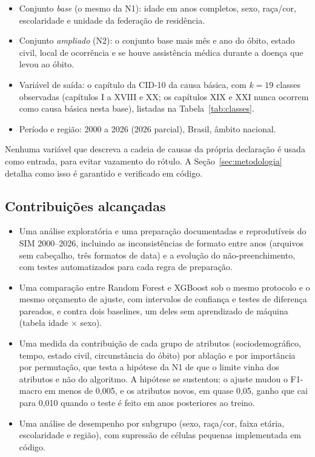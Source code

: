 \documentclass[12pt]{article}
\begin{document}
\begin{itemize}
  \item Conjunto \emph{base} (o mesmo da N1): idade em anos completos, sexo, raça/cor, escolaridade e unidade da federação de residência.
  \item Conjunto \emph{ampliado} (N2): o conjunto base mais mês e ano do óbito, estado civil, local de ocorrência e se houve assistência médica durante a doença que levou ao óbito.
  \item Variável de saída: o capítulo da CID-10 da causa básica, com $k = 19$ classes observadas (capítulos I a XVIII e XX; os capítulos XIX e XXI nunca ocorrem como causa básica nesta base), listadas na Tabela~\ref{tab:classes}.
  \item Período e região: 2000 a 2026 (2026 parcial), Brasil, âmbito nacional.
\end{itemize}

Nenhuma variável que descreva a cadeia de causas da própria declaração é usada como entrada, para evitar vazamento do rótulo. A Seção~\ref{sec:metodologia} detalha como isso é garantido e verificado em código.

\subsection{Contribuições alcançadas}

\begin{itemize}
  \item Uma análise exploratória e uma preparação documentadas e reprodutíveis do SIM 2000--2026, incluindo as inconsistências de formato entre anos (arquivos sem cabeçalho, três formatos de data) e a evolução do não-preenchimento, com testes automatizados para cada regra de preparação.
  \item Uma comparação entre Random Forest e XGBoost sob o mesmo protocolo e o mesmo orçamento de ajuste, com intervalos de confiança e testes de diferença pareados, e contra dois baselines, um deles sem aprendizado de máquina (tabela idade $\times$ sexo).
  \item Uma medida da contribuição de cada grupo de atributos (sociodemográfico, tempo, estado civil, circunstância do óbito) por ablação e por importância por permutação, que testa a hipótese da N1 de que o limite vinha dos atributos e não do algoritmo. A hipótese se sustentou: o ajuste mudou o F1-macro em menos de 0,005, e os atributos novos, em quase 0,05, ganho que cai para 0,010 quando o teste é feito em anos posteriores ao treino.
  \item Uma análise de desempenho por subgrupo (sexo, raça/cor, faixa etária, escolaridade e região), com supressão de células pequenas implementada em código.
\end{itemize}
\end{document}
